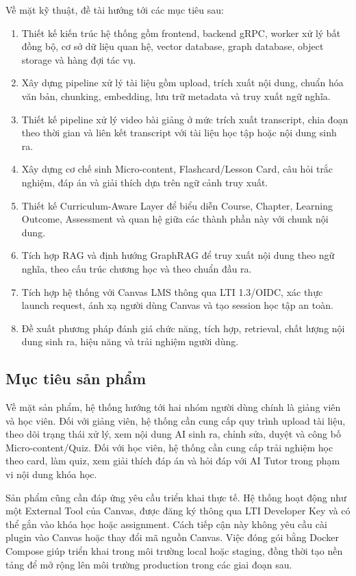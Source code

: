 Về mặt kỹ thuật, đề tài hướng tới các mục tiêu sau:
\begin{enumerate}
    \item Thiết kế kiến trúc hệ thống gồm frontend, backend gRPC, worker xử lý
          bất đồng bộ, cơ sở dữ liệu quan hệ, vector database, graph database,
          object storage và hàng đợi tác vụ.
    \item Xây dựng pipeline xử lý tài liệu gồm upload, trích xuất nội dung,
          chuẩn hóa văn bản, chunking, embedding, lưu trữ metadata và truy
          xuất ngữ nghĩa.
    \item Thiết kế pipeline xử lý video bài giảng ở mức trích xuất transcript,
          chia đoạn theo thời gian và liên kết transcript với tài liệu học tập
          hoặc nội dung sinh ra.
    \item Xây dựng cơ chế sinh Micro-content, Flashcard/Lesson Card, câu hỏi
          trắc nghiệm, đáp án và giải thích dựa trên ngữ cảnh truy xuất.
    \item Thiết kế Curriculum-Aware Layer để biểu diễn Course, Chapter,
          Learning Outcome, Assessment và quan hệ giữa các thành phần này với
          chunk nội dung.
    \item Tích hợp RAG và định hướng GraphRAG để truy xuất nội dung theo ngữ
          nghĩa, theo cấu trúc chương học và theo chuẩn đầu ra.
    \item Tích hợp hệ thống với Canvas LMS thông qua LTI 1.3/OIDC, xác thực
          launch request, ánh xạ người dùng Canvas và tạo session học tập an
          toàn.
    \item Đề xuất phương pháp đánh giá chức năng, tích hợp, retrieval, chất
          lượng nội dung sinh ra, hiệu năng và trải nghiệm người dùng.
\end{enumerate}

\subsection{Mục tiêu sản phẩm}

Về mặt sản phẩm, hệ thống hướng tới hai nhóm người dùng chính là giảng viên và
học viên. Đối với giảng viên, hệ thống cần cung cấp quy trình upload tài liệu,
theo dõi trạng thái xử lý, xem nội dung AI sinh ra, chỉnh sửa, duyệt và công
bố Micro-content/Quiz. Đối với học viên, hệ thống cần cung cấp trải nghiệm học
theo card, làm quiz, xem giải thích đáp án và hỏi đáp với AI Tutor trong phạm
vi nội dung khóa học.

Sản phẩm cũng cần đáp ứng yêu cầu triển khai thực tế. Hệ thống hoạt động như
một External Tool của Canvas, được đăng ký thông qua LTI Developer Key và có
thể gắn vào khóa học hoặc assignment. Cách tiếp cận này không yêu cầu cài
plugin vào Canvas hoặc thay đổi mã nguồn Canvas. Việc đóng gói bằng Docker
Compose giúp triển khai trong môi trường local hoặc staging, đồng thời tạo nền
tảng để mở rộng lên môi trường production trong các giai đoạn sau.

